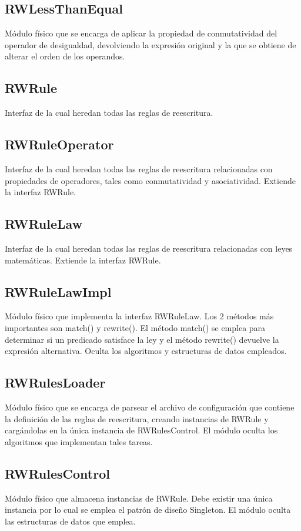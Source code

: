 \documentclass[a4paper,10pt]{report}
\begin{document}
				\subsection{RWLessThanEqual}
				Módulo físico que se encarga de aplicar la propiedad de conmutatividad del operador de desigualdad, devolviendo la expresión original y la que se obtiene de alterar el orden de los operandos.
				\subsection{RWRule}
				Interfaz de la cual heredan todas las reglas de reescritura.
				\subsection{RWRuleOperator}
				Interfaz de la cual heredan todas las reglas de reescritura relacionadas con propiedades de operadores, tales como conmutatividad y asociatividad. Extiende la interfaz RWRule.
				\subsection{RWRuleLaw}
				Interfaz de la cual heredan todas las reglas de reescritura relacionadas con leyes matemáticas. Extiende la interfaz RWRule.
				\subsection{RWRuleLawImpl}
				Módulo físico que implementa la interfaz RWRuleLaw. Los 2 métodos más importantes son match() y rewrite(). El método match() se emplea para determinar si un predicado satisface la ley y el método rewrite() devuelve la expresión alternativa.
				Oculta los algoritmos y estructuras de datos empleados.
				\subsection{RWRulesLoader}
				Módulo físico que se encarga de parsear el archivo de configuración que contiene la definición de las reglas de reescritura, creando instancias de RWRule y cargándolas en la única instancia de RWRulesControl. El módulo oculta los algoritmos que implementan tales tareas.
				\subsection{RWRulesControl}
				Módulo físico que almacena instancias de RWRule. Debe existir una única instancia por lo cual se emplea el patrón de diseño Singleton. El módulo oculta las estructuras de datos que emplea.
\end{document}
